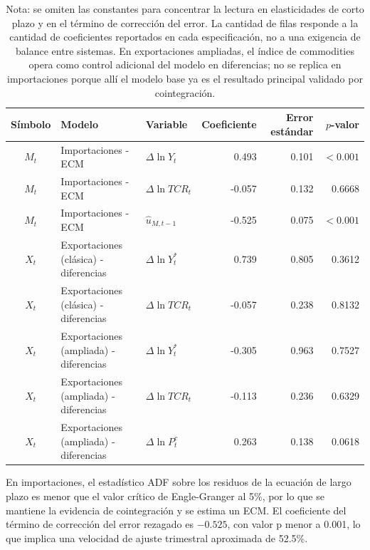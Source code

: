 \documentclass[11pt,a4paper]{article}
\begin{document}
	\begin{table}[H]
		\centering
		\caption{Coeficientes de corto plazo: ECM y primeras diferencias.}
		\label{tab:coeficientes-corto-plazo}
		\scriptsize
		\begin{tabular}{cllrrr}
			\toprule
			Símbolo & Modelo & Variable & Coeficiente & Error estándar & \(p\)-valor \\
			\midrule
			\(M_t\) & Importaciones - ECM & \(\Delta \ln Y_t\) & 0.493 & 0.101 & \(<0.001\) \\
			\(M_t\) & Importaciones - ECM & \(\Delta \ln TCR_t\) & -0.057 & 0.132 & 0.6668 \\
			\(M_t\) & Importaciones - ECM & \(\hat{u}_{M,t-1}\) & -0.525 & 0.075 & \(<0.001\) \\
			\addlinespace
			\(X_t\) & Exportaciones (clásica) - diferencias & \(\Delta \ln Y_t^*\) & 0.739 & 0.805 & 0.3612 \\
			\(X_t\) & Exportaciones (clásica) - diferencias & \(\Delta \ln TCR_t\) & -0.057 & 0.238 & 0.8132 \\
			\addlinespace
			\(X_t\) & Exportaciones (ampliada) - diferencias & \(\Delta \ln Y_t^*\) & -0.305 & 0.963 & 0.7527 \\
			\(X_t\) & Exportaciones (ampliada) - diferencias & \(\Delta \ln TCR_t\) & -0.113 & 0.236 & 0.6329 \\
			\(X_t\) & Exportaciones (ampliada) - diferencias & \(\Delta \ln P_t^c\) & 0.263 & 0.138 & 0.0618 \\
			\bottomrule
		\end{tabular}
		\caption*{\footnotesize Nota: se omiten las constantes para concentrar la
			lectura en elasticidades de corto plazo y en el término de corrección del error.
			La cantidad de filas responde a la cantidad de coeficientes reportados en cada
			especificación, no a una exigencia de balance entre sistemas. En exportaciones
			ampliadas, el índice de commodities opera como control adicional del modelo en
			diferencias; no se replica en importaciones porque allí el modelo base ya es
			el resultado principal validado por cointegración.}
	\end{table}

	En importaciones, el estadístico ADF sobre los residuos de la ecuación de largo
	plazo es menor que el valor crítico de Engle-Granger al 5\%, por lo que se
	mantiene la evidencia de cointegración y se estima un ECM. El coeficiente del
	término de corrección del error rezagado es \(-0.525\), con valor p menor a
	0.001, lo que implica una velocidad de ajuste trimestral aproximada de 52.5\%.
\end{document}
